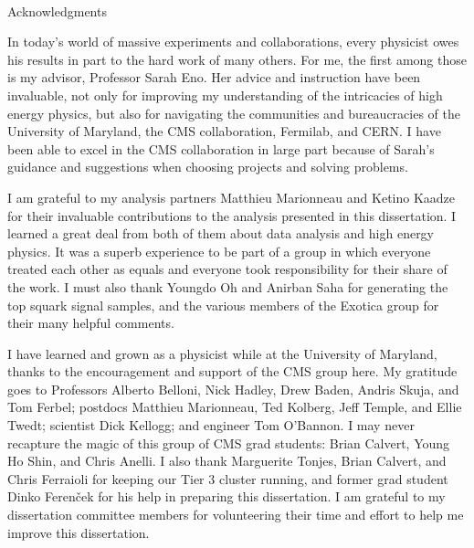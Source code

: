 
\renewcommand{\baselinestretch}{2}
\small\normalsize
\hbox{\ }
 
\vspace{-.65in}

\begin{center}
\large{Acknowledgments} 
\end{center} 

\vspace{1ex}

In today's world of massive experiments and collaborations, every physicist owes his results in part to the hard work of many others. For me, the first among those is my advisor, Professor Sarah Eno. Her advice and instruction have been invaluable, not only for improving my understanding of the intricacies of high energy physics, but also for navigating the communities and bureaucracies of the University of Maryland, the CMS collaboration, Fermilab, and CERN. I have been able to excel in the CMS collaboration in large part because of Sarah's guidance and suggestions when choosing projects and solving problems.

I am grateful to my analysis partners Matthieu Marionneau and Ketino Kaadze for their invaluable contributions to the analysis presented in this dissertation. I learned a great deal from both of them about data analysis and high energy physics. It was a superb experience to be part of a group in which everyone treated each other as equals and everyone took responsibility for their share of the work. I must also thank Youngdo Oh and Anirban Saha for generating the top squark signal samples, and the various members of the Exotica group for their many helpful comments.

I have learned and grown as a physicist while at the University of Maryland, thanks to the encouragement and support of the CMS group here. My gratitude goes to Professors Alberto Belloni, Nick Hadley, Drew Baden, Andris Skuja, and Tom Ferbel; postdocs Matthieu Marionneau, Ted Kolberg, Jeff Temple, and Ellie Twedt; scientist Dick Kellogg; and engineer Tom O'Bannon. I may never recapture the magic of this group of CMS grad students: Brian Calvert, Young Ho Shin, and Chris Anelli. I also thank Marguerite Tonjes, Brian Calvert, and Chris Ferraioli for keeping our Tier 3 cluster running, and former grad student Dinko Feren\v{c}ek for his help in preparing this dissertation. I am grateful to my dissertation committee members for volunteering their time and effort to help me improve this dissertation.

